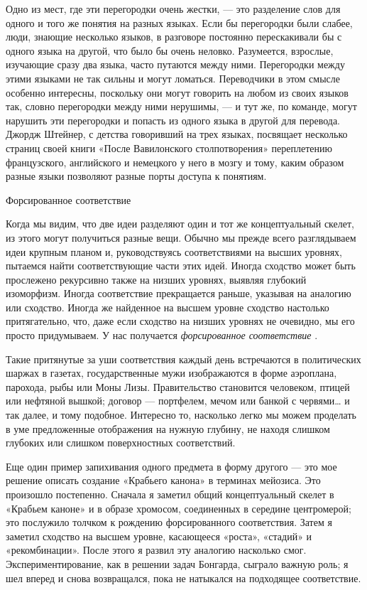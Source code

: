 \documentclass[../main.tex]{subfiles}
\begin{document}
Одно из мест, где эти перегородки очень жестки, --- это разделение слов для одного и того же понятия на разных языках. Если бы перегородки были слабее, люди, знающие несколько языков, в разговоре постоянно перескакивали бы с одного языка на другой, что было бы очень неловко. Разумеется, взрослые, изучающие сразу два языка, часто путаются между ними. Перегородки между этими языками не так сильны и могут ломаться. Переводчики в этом смысле особенно интересны, поскольку они могут говорить на любом из своих языков так, словно перегородки между ними нерушимы, --- и тут же, по команде, могут нарушить эти перегородки и попасть из одного языка в другой для перевода. Джордж Штейнер, с детства говоривший на трех языках, посвящает несколько страниц своей книги «После Вавилонского столпотворения» переплетению французского, английского и немецкого у него в мозгу и тому, каким образом разные языки позволяют разные порты доступа к понятиям.

Форсированное соответствие

Когда мы видим, что две идеи разделяют один и тот же концептуальный скелет, из этого могут получиться разные вещи. Обычно мы прежде всего разглядываем идеи крупным планом и, руководствуясь соответствиями на высших уровнях, пытаемся найти соответствующие части этих идей. Иногда сходство может быть прослежено рекурсивно также на низших уровнях, выявляя глубокий изоморфизм. Иногда соответствие прекращается раньше, указывая на аналогию или сходство. Иногда же найденное на высшем уровне сходство настолько притягательно, что, даже если сходство на низших уровнях не очевидно, мы его просто придумываем. У нас получается \emph{форсированное соответствие} .

Такие притянутые за уши соответствия каждый день встречаются в политических шаржах в газетах, государственные мужи изображаются в форме аэроплана, парохода, рыбы или Моны Лизы. Правительство становится человеком, птицей или нефтяной вышкой; договор --- портфелем, мечом или банкой с червями\ldots{} и так далее, и тому подобное. Интересно то, насколько легко мы можем проделать в уме предложенные отображения на нужную глубину, не находя слишком глубоких или слишком поверхностных соответствий.

Еще один пример запихивания одного предмета в форму другого --- это мое решение описать создание «Крабьего канона» в терминах мейозиса. Это произошло постепенно. Сначала я заметил общий концептуальный скелет в «Крабьем каноне» и в образе хромосом, соединенных в середине центромерой; это послужило толчком к рождению форсированного соответствия. Затем я заметил сходство на высшем уровне, касающееся «роста», «стадий» и «рекомбинации». После этого я развил эту аналогию насколько смог. Экспериментирование, как в решении задач Бонгарда, сыграло важную роль; я шел вперед и снова возвращался, пока не натыкался на подходящее соответствие.
\end{document}

